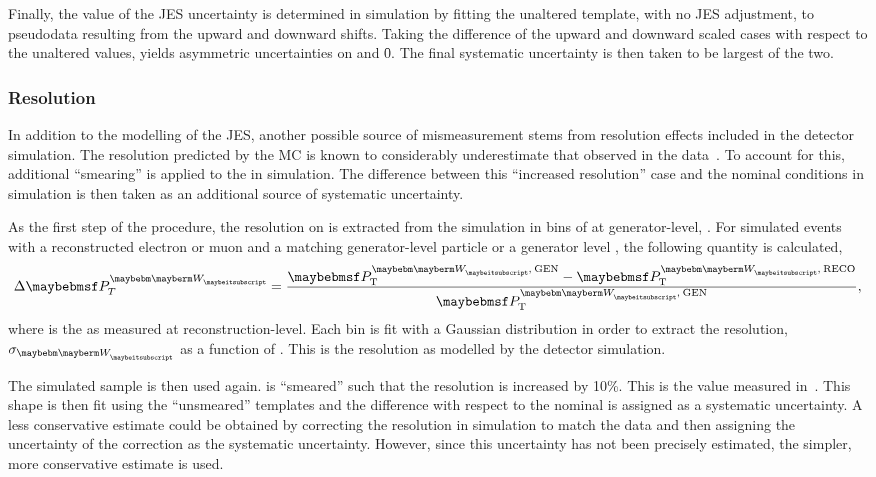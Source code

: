 Finally, the value of the \ac{JES} uncertainty is determined in simulation by
fitting the unaltered template, with no \ac{JES} adjustment, to pseudodata
resulting from the upward and downward shifts. Taking the difference of the
upward and downward scaled cases with respect to the unaltered values, yields
asymmetric uncertainties on \fLmfR and \f0. The final systematic uncertainty is
then taken to be largest of the two.

\subsubsection{\MET Resolution}
In addition to the modelling of the \ac{JES}, another possible source of
mismeasurement stems from resolution effects included in the detector
simulation. The resolution predicted by the \ac{MC} is known to considerably
underestimate that observed in the data~\cite{cms_met_paper,cms_met_pas}. To
account for this, additional ``smearing'' is applied to the \MET in
simulation. The difference between this ``increased resolution'' case and the
nominal conditions in simulation is then taken as an additional source of
systematic uncertainty.

As the first step of the procedure, the resolution on \PtW is extracted from the
simulation in bins of \PtW at generator-level, \PtWgen . For simulated \Wjets
events with a reconstructed electron or muon and a matching generator-level
particle or a generator level \Ptau, the following quantity is calculated,
\begin{equation*}
\Delta\PtW = \frac{\PtWgen - \PtWreco}{\PtWgen},
\end{equation*}
where \PtWreco is the \PtW as measured at reconstruction-level. Each \PtWgen bin
is fit with a Gaussian distribution in order to extract the resolution,
$\sigma_{\PW}$ as a function of \PtW. This is the \PtW resolution as modelled by
the detector simulation.

The simulated sample is then used again. \PtWreco is ``smeared'' such that the
resolution is increased by 10\%. This is the value measured
in~\cite{cms_met_paper}. This shape is then fit using the ``unsmeared''
templates and the difference with respect to the nominal is assigned as a
systematic uncertainty. A less conservative estimate could be obtained by
correcting the resolution in simulation to match the data and then assigning the
uncertainty of the correction as the systematic uncertainty. However, since this
uncertainty has not been precisely estimated, the simpler, more conservative
estimate is used.


